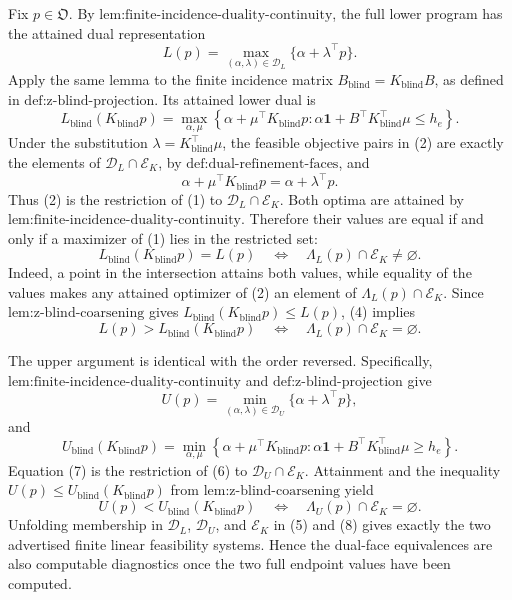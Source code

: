 Fix \(p\in\mathfrak O\).  By \(\text{lem:finite-incidence-duality-continuity}\), the full lower program has the attained dual representation
\[
 L(p)=\max_{(\alpha,\lambda)\in\mathcal D_L}
       \{\alpha+\lambda^{\top}p\}.
\tag{1}
\]
Apply the same lemma to the finite incidence matrix \(B_{\mathrm{blind}}=K_{\mathrm{blind}}B\), as defined in \(\text{def:z-blind-projection}\).  Its attained lower dual is
\[
 L_{\mathrm{blind}}(K_{\mathrm{blind}}p)
 =\max_{\alpha,\mu}
 \left\{\alpha+\mu^{\top}K_{\mathrm{blind}}p:
 \alpha\mathbf 1+B^{\top}K_{\mathrm{blind}}^{\top}\mu\leq h_e\right\}.
\tag{2}
\]
Under the substitution \(\lambda=K_{\mathrm{blind}}^{\top}\mu\), the feasible objective pairs in (2) are exactly the elements of \(\mathcal D_L\cap\mathcal E_K\), by \(\text{def:dual-refinement-faces}\), and
\[
 \alpha+\mu^{\top}K_{\mathrm{blind}}p
 =\alpha+\lambda^{\top}p.
\tag{3}
\]
Thus (2) is the restriction of (1) to \(\mathcal D_L\cap\mathcal E_K\).  Both optima are attained by \(\text{lem:finite-incidence-duality-continuity}\).  Therefore their values are equal if and only if a maximizer of (1) lies in the restricted set:
\[
 L_{\mathrm{blind}}(K_{\mathrm{blind}}p)=L(p)
 \quad\Longleftrightarrow\quad
 \Lambda_L(p)\cap\mathcal E_K\neq\varnothing.
\tag{4}
\]
Indeed, a point in the intersection attains both values, while equality of the values makes any attained optimizer of (2) an element of \(\Lambda_L(p)\cap\mathcal E_K\).  Since \(\text{lem:z-blind-coarsening}\) gives
\(L_{\mathrm{blind}}(K_{\mathrm{blind}}p)\leq L(p)\), (4) implies
\[
 L(p)>L_{\mathrm{blind}}(K_{\mathrm{blind}}p)
 \quad\Longleftrightarrow\quad
 \Lambda_L(p)\cap\mathcal E_K=\varnothing.
\tag{5}
\]

The upper argument is identical with the order reversed.  Specifically, \(\text{lem:finite-incidence-duality-continuity}\) and \(\text{def:z-blind-projection}\) give
\[
 U(p)=\min_{(\alpha,\lambda)\in\mathcal D_U}
       \{\alpha+\lambda^{\top}p\},
\tag{6}
\]
and
\[
 U_{\mathrm{blind}}(K_{\mathrm{blind}}p)
 =\min_{\alpha,\mu}
 \left\{\alpha+\mu^{\top}K_{\mathrm{blind}}p:
 \alpha\mathbf 1+B^{\top}K_{\mathrm{blind}}^{\top}\mu\geq h_e\right\}.
\tag{7}
\]
Equation (7) is the restriction of (6) to \(\mathcal D_U\cap\mathcal E_K\).  Attainment and the inequality
\(U(p)\leq U_{\mathrm{blind}}(K_{\mathrm{blind}}p)\) from \(\text{lem:z-blind-coarsening}\) yield
\[
 U(p)<U_{\mathrm{blind}}(K_{\mathrm{blind}}p)
 \quad\Longleftrightarrow\quad
 \Lambda_U(p)\cap\mathcal E_K=\varnothing.
\tag{8}
\]
Unfolding membership in \(\mathcal D_L\), \(\mathcal D_U\), and \(\mathcal E_K\) in (5) and (8) gives exactly the two advertised finite linear feasibility systems.  Hence the dual-face equivalences are also computable diagnostics once the two full endpoint values have been computed.

